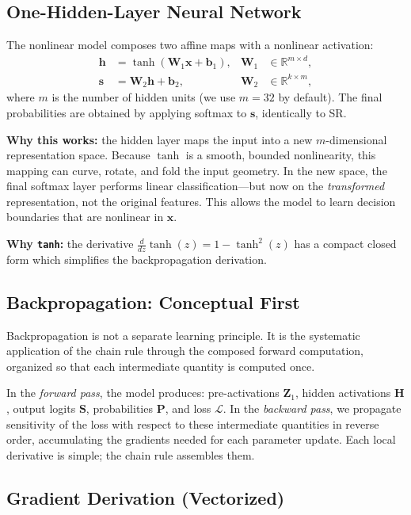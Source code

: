 \documentclass[11pt]{article}
\newcommand{\R}{\mathbb{R}}
\newcommand{\loss}{\mathcal{L}}
\newcommand{\vx}{\mathbf{x}}
\newcommand{\vh}{\mathbf{h}}
\newcommand{\vs}{\mathbf{s}}
\newcommand{\mH}{\mathbf{H}}
\newcommand{\mP}{\mathbf{P}}
\newcommand{\mS}{\mathbf{S}}
\begin{document}
\subsection{One-Hidden-Layer Neural Network}

The nonlinear model composes two affine maps with a nonlinear activation:
\begin{align}
    \vh &= \tanh(\mathbf{W}_1 \vx + \mathbf{b}_1), & \mathbf{W}_1 &\in \R^{m \times d},\\
    \vs &= \mathbf{W}_2 \vh + \mathbf{b}_2,          & \mathbf{W}_2 &\in \R^{k \times m},
\end{align}
where $m$ is the number of hidden units (we use $m = 32$ by default).
The final probabilities are obtained by applying softmax to $\vs$, identically to SR.

\textbf{Why this works:} the hidden layer maps the input into a new $m$-dimensional
representation space.
Because $\tanh$ is a smooth, bounded nonlinearity, this mapping can curve, rotate, and
fold the input geometry.
In the new space, the final softmax layer performs linear classification---but now on
the \emph{transformed} representation, not the original features.
This allows the model to learn decision boundaries that are nonlinear in $\vx$.

\textbf{Why \texttt{tanh}:} the derivative $\frac{d}{dz}\tanh(z) = 1 - \tanh^2(z)$
has a compact closed form which simplifies the backpropagation derivation.

\subsection{Backpropagation: Conceptual First}

Backpropagation is not a separate learning principle.
It is the systematic application of the chain rule through the composed forward
computation, organized so that each intermediate quantity is computed once.

In the \emph{forward pass}, the model produces: pre-activations $\mathbf{Z}_1$,
hidden activations $\mH$, output logits $\mS$, probabilities $\mP$, and loss $\loss$.
In the \emph{backward pass}, we propagate sensitivity of the loss with respect to these
intermediate quantities in reverse order, accumulating the gradients needed for each
parameter update.
Each local derivative is simple; the chain rule assembles them.

\subsection{Gradient Derivation (Vectorized)}
\end{document}
